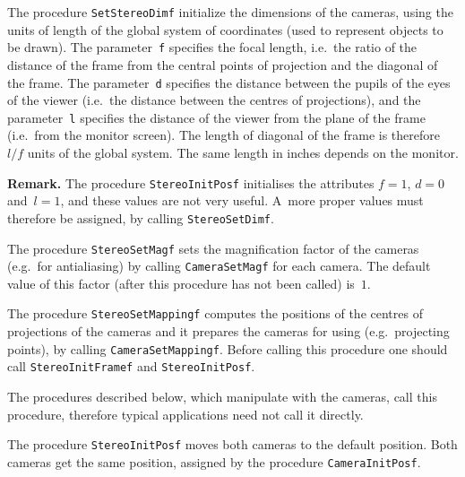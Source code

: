 \vspace{\bigskipamount}
The procedure \texttt{SetStereoDimf} initialize the dimensions of the
cameras,
using the units of length of the global system of coordinates (used to
represent objects to be drawn). The parameter~\texttt{f} specifies the
focal length, i.e.\ the ratio of the distance of the frame from the   
central points of projection and the diagonal of the frame.
The parameter~\texttt{d} specifies the distance between the pupils of the
eyes of the viewer (i.e.\ the distance between the centres of projections),
and the parameter~\texttt{l} specifies the distance of the viewer from the 
plane of the frame (i.e.\ from the monitor screen). The length of diagonal 
of the frame is therefore $l/f$ units of the global system. The same length
in inches depends on the monitor.

\vspace{\medskipamount}\noindent
\textbf{Remark.} The procedure \texttt{StereoInitPosf} initialises
the attributes $f=1$, $d=0$ and~$l=1$, and these values are not very
useful. A~more proper values must therefore be assigned, by calling 
\texttt{StereoSetDimf}.

\vspace{\bigskipamount}
The procedure \texttt{StereoSetMagf} sets the magnification factor
of the cameras (e.g.\ for antialiasing) by calling
\texttt{CameraSetMagf} for each camera. The default value of this
factor (after this procedure has not been called) is~$1$.

\vspace{\bigskipamount}
The procedure \texttt{StereoSetMappingf} computes the positions of the centres
of projections of the cameras and it prepares the cameras for using
(e.g.\ projecting points), by calling \texttt{CameraSetMappingf}.
Before calling this procedure one should call
\texttt{StereoInitFramef} and \texttt{StereoInitPosf}.

The procedures described below, which manipulate with the cameras,
call this procedure, therefore typical applications need not call it
directly.

\vspace{\bigskipamount}
\begin{sloppypar}
The procedure \texttt{StereoInitPosf} moves both cameras to the default
position. Both cameras get the same position, assigned by
the procedure \texttt{CameraInitPosf}.%
\end{sloppypar}

